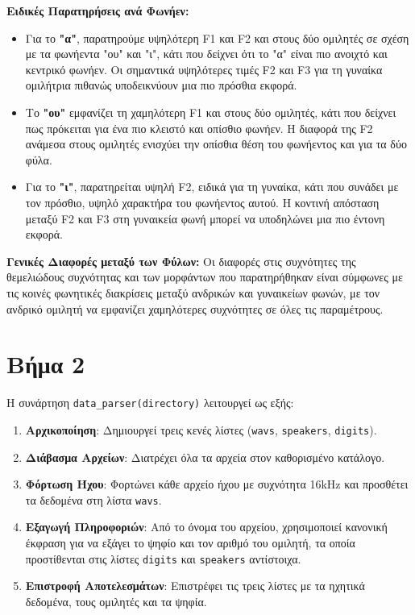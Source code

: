 \documentclass[a4paper,12pt]{article}
\begin{document}
\textbf{Ειδικές Παρατηρήσεις ανά Φωνήεν:}
\begin{itemize}
    \item Για το \textbf{"α"}, παρατηρούμε υψηλότερη F1 και F2 και στους δύο ομιλητές σε σχέση με τα φωνήεντα "ου" και "ι", κάτι που δείχνει ότι το "α" είναι πιο ανοιχτό και κεντρικό φωνήεν. Οι σημαντικά υψηλότερες τιμές F2 και F3 για τη γυναίκα ομιλήτρια πιθανώς υποδεικνύουν μια πιο πρόσθια εκφορά.
    \item Το \textbf{"ου"} εμφανίζει τη χαμηλότερη F1 και στους δύο ομιλητές, κάτι που δείχνει πως πρόκειται για ένα πιο κλειστό και οπίσθιο φωνήεν. Η διαφορά της F2 ανάμεσα στους ομιλητές ενισχύει την οπίσθια θέση του φωνήεντος και για τα δύο φύλα.
    \item Για το \textbf{"ι"}, παρατηρείται υψηλή F2, ειδικά για τη γυναίκα, κάτι που συνάδει με τον πρόσθιο, υψηλό χαρακτήρα του φωνήεντος αυτού. Η κοντινή απόσταση μεταξύ F2 και F3 στη γυναικεία φωνή μπορεί να υποδηλώνει μια πιο έντονη εκφορά.
\end{itemize}

\textbf{Γενικές Διαφορές μεταξύ των Φύλων:}
Οι διαφορές στις συχνότητες της θεμελιώδους συχνότητας και των μορφάντων που παρατηρήθηκαν είναι σύμφωνες με τις κοινές φωνητικές διακρίσεις μεταξύ ανδρικών και γυναικείων φωνών, με τον ανδρικό ομιλητή να εμφανίζει χαμηλότερες συχνότητες σε όλες τις παραμέτρους.

\section*{Βήμα 2}

Η συνάρτηση \texttt{data\_parser(directory)} λειτουργεί ως εξής:

\begin{enumerate}
    \item \textbf{Αρχικοποίηση}: Δημιουργεί τρεις κενές λίστες (\texttt{wavs}, \texttt{speakers}, \texttt{digits}).
    \item \textbf{Διάβασμα Αρχείων}: Διατρέχει όλα τα αρχεία στον καθορισμένο κατάλογο.
    \item \textbf{Φόρτωση Ήχου}: Φορτώνει κάθε αρχείο ήχου με συχνότητα 16kHz και προσθέτει τα δεδομένα στη λίστα \texttt{wavs}.
    \item \textbf{Εξαγωγή Πληροφοριών}: Από το όνομα του αρχείου, χρησιμοποιεί κανονική έκφραση για να εξάγει το ψηφίο και τον αριθμό του ομιλητή, τα οποία προστίθενται στις λίστες \texttt{digits} και \texttt{speakers} αντίστοιχα.
    \item \textbf{Επιστροφή Αποτελεσμάτων}: Επιστρέφει τις τρεις λίστες με τα ηχητικά δεδομένα, τους ομιλητές και τα ψηφία.
\end{enumerate}
\end{document}
